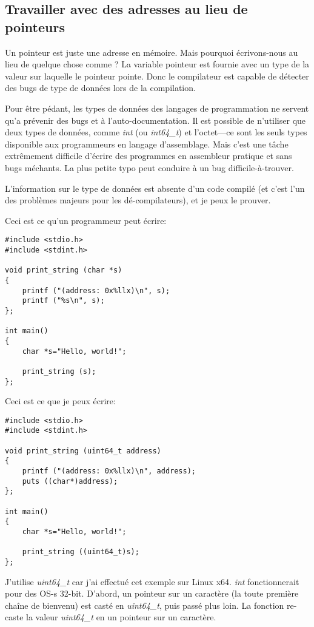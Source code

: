 \subsection{Travailler avec des adresses au lieu de pointeurs}

Un pointeur est juste une adresse en mémoire. Mais pourquoi écrivons-nous 
au lieu de quelque chose comme ?
La variable pointeur est fournie avec un type de la valeur sur laquelle le pointeur
pointe.
Donc le compilateur est capable de détecter des bugs de type de données lors de la
compilation.

Pour être pédant, les types de données des langages de programmation ne servent qu'a
prévenir des bugs et à l'auto-documentation.
Il est possible de n'utiliser que deux types de données, comme \emph{int} (ou \emph{int64\_t})
et l'octet---ce sont les seuls types disponible aux programmeurs en langage d'assemblage.
Mais c'est une tâche extrêmement difficile d'écrire des programmes en assembleur
pratique et sans bugs méchants.
La plus petite typo peut conduire à un bug difficile-à-trouver.

L'information sur le type de données est absente d'un code compilé (et c'est l'un
des problèmes majeurs pour les dé-compilateurs), et je peux le prouver.

Ceci est ce qu'un programmeur \CCpp peut écrire:

\begin{lstlisting}[style=customc]
#include <stdio.h>
#include <stdint.h>

void print_string (char *s)
{
	printf ("(address: 0x%llx)\n", s);
	printf ("%s\n", s);
};

int main()
{
	char *s="Hello, world!";

	print_string (s);
};
\end{lstlisting}

Ceci est ce que je peux écrire:

\begin{lstlisting}[style=customc]
#include <stdio.h>
#include <stdint.h>

void print_string (uint64_t address)
{
	printf ("(address: 0x%llx)\n", address);
	puts ((char*)address);
};

int main()
{
	char *s="Hello, world!";

	print_string ((uint64_t)s);
};
\end{lstlisting}

J'utilise \emph{uint64\_t} car j'ai effectué cet exemple sur Linux x64. \emph{int} fonctionnerait
pour des \ac{OS}-s 32-bit.
D'abord, un pointeur sur un caractère (la toute première chaîne de bienvenu) est
casté en \emph{uint64\_t}, puis passé plus loin.
La fonction  re-caste la valeur \emph{uint64\_t} en un pointeur
sur un caractère.

